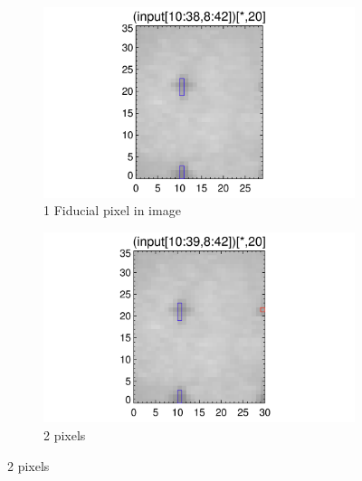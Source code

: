 \documentclass[10pt]{article}
\begin{document}
\begin{figure}[!h]
    \centering 
    \begin{subfigure}[b]{.45\linewidth}
        \centering
        \includegraphics[width=1.3\textwidth]{plots_tables_images/fidcheck_newdegree0.png}
        \caption{1 Fiducial pixel in image}
    \end{subfigure}
    \begin{subfigure}[b]{.45\linewidth}
        \centering
        \includegraphics[width=1.3\textwidth]{plots_tables_images/fidcheck_newdegree1.png}
        \caption{2 pixels}
    \end{subfigure}
   

\end{figure}
\end{document}
